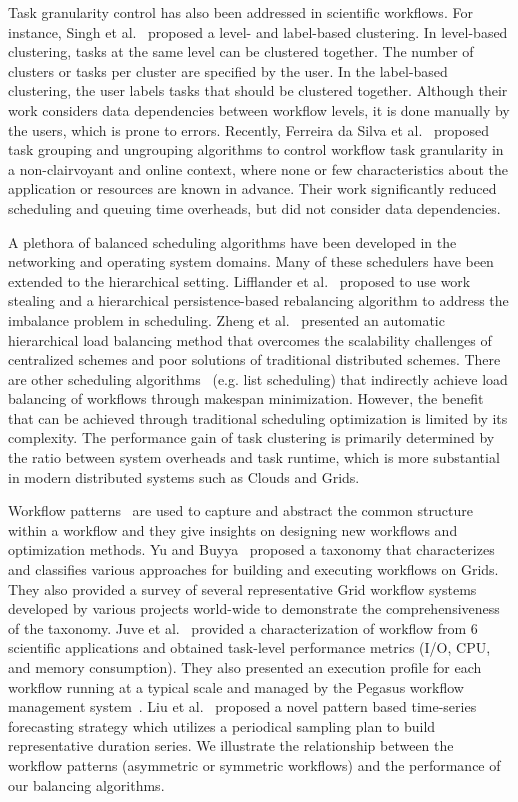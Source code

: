 Task granularity control has also been addressed in scientific workflows. For instance, Singh et al.~\cite{Singh2008} proposed a level- and label-based clustering. In level-based clustering, tasks at the same level can be clustered together. The number of clusters or tasks per cluster are specified by the user. In the label-based clustering, the user labels tasks that should be clustered together. Although their work considers data dependencies between workflow levels, it is done manually by the users, which is prone to errors. Recently, Ferreira da Silva et al.~\cite{Ferreira-granularity-2013} proposed task grouping and ungrouping algorithms to control workflow task granularity in a non-clairvoyant and online context, where none or few characteristics about the application or resources are known in advance. Their work significantly reduced scheduling and queuing time overheads, but did not consider data dependencies.

A plethora of balanced scheduling algorithms have been developed in the networking and operating system domains. Many of these schedulers have been extended to the hierarchical setting. Lifflander et al.~\cite{Lifflander2012} proposed to use work stealing and a hierarchical persistence-based rebalancing algorithm to address the imbalance problem in scheduling. Zheng et al.~\cite{Zheng2011} presented an automatic hierarchical load balancing method that overcomes the scalability challenges of centralized schemes and poor solutions of traditional distributed schemes. There are other scheduling algorithms~\cite{Braun2001} (e.g. list scheduling) that indirectly achieve load balancing of workflows through makespan minimization. However, the benefit that can be achieved through traditional scheduling optimization is limited by its complexity. The performance gain of task clustering is primarily determined by the ratio between system overheads and task runtime, which is more substantial in modern distributed systems such as Clouds and Grids. 

Workflow patterns~\cite{Yu2005a, Juve2013, Liu2008} are used to capture and abstract the common structure within a workflow and they give insights on designing new workflows and optimization methods. Yu and Buyya~\cite{Yu2005a} proposed a taxonomy that characterizes and classifies various approaches for building and executing workflows on Grids. They also provided a survey of several representative Grid workflow systems developed by various projects world-wide to demonstrate the comprehensiveness of the taxonomy. Juve et al.~\cite{Juve2013} provided a characterization of workflow from 6 scientific applications and obtained task-level performance metrics (I/O, CPU, and memory consumption). They also presented an execution profile for each workflow running at a typical scale and managed by the Pegasus workflow management system~\cite{Deelman2005}. Liu et al.~\cite{Liu2008} proposed a novel pattern based time-series forecasting strategy which utilizes a periodical sampling plan to build representative duration series. We illustrate the relationship between the workflow patterns (asymmetric or symmetric workflows) and the performance of our balancing algorithms. 

